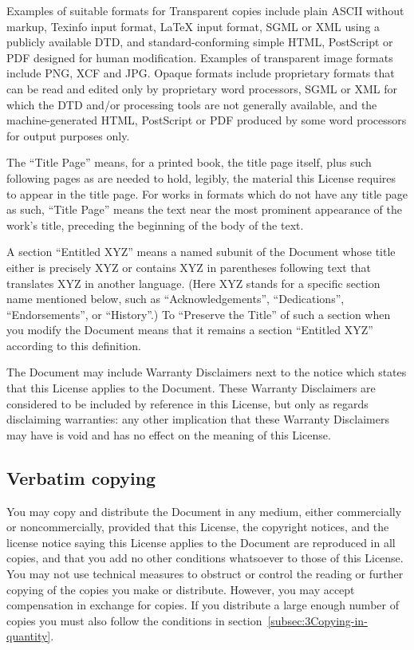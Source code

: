 Examples of suitable formats for Transparent copies include plain
ASCII without markup, Texinfo input format, \LaTeX{} input format,
SGML or XML using a publicly available DTD, and standard-conforming
simple HTML, Post\-Script or PDF designed for human modification.
Examples of transparent image formats include PNG, XCF and JPG. Opaque
formats include proprietary formats that can be read and edited only
by proprietary word processors, SGML or XML for which the DTD and/or
processing tools are not generally available, and the machine-generated
HTML, Post\-Script or PDF produced by some word processors for output
purposes only.

The ``Title Page'' means, for a printed book, the title page itself,
plus such following pages as are needed to hold, legibly, the material
this License requires to appear in the title page. For works in formats
which do not have any title page as such, ``Title Page'' means the
text near the most prominent appearance of the work's title, preceding
the beginning of the body of the text.

A section ``Entitled XYZ'' means a named subunit of the Document whose
title either is precisely XYZ or contains XYZ in parentheses following
text that translates XYZ in another language. (Here XYZ stands for
a specific section name mentioned below, such as ``Acknowledgements'',
``Dedications'', ``Endorsements'', or ``History''.) To ``Preserve
the Title'' of such a section when you modify the Document means that
it remains a section ``Entitled XYZ'' according to this definition.

The Document may include Warranty Disclaimers next to the notice which
states that this License applies to the Document. These Warranty Disclaimers
are considered to be included by reference in this License, but only
as regards disclaiming warranties: any other implication that these
Warranty Disclaimers may have is void and has no effect on the meaning
of this License.

\subsection{Verbatim copying\label{subsec:2Verbatim-copying}}

You may copy and distribute the Document in any medium, either commercially
or noncommercially, provided that this License, the copyright notices,
and the license notice saying this License applies to the Document
are reproduced in all copies, and that you add no other conditions
whatsoever to those of this License. You may not use technical measures
to obstruct or control the reading or further copying of the copies
you make or distribute. However, you may accept compensation in exchange
for copies. If you distribute a large enough number of copies you
must also follow the conditions in section~\ref{subsec:3Copying-in-quantity}.

